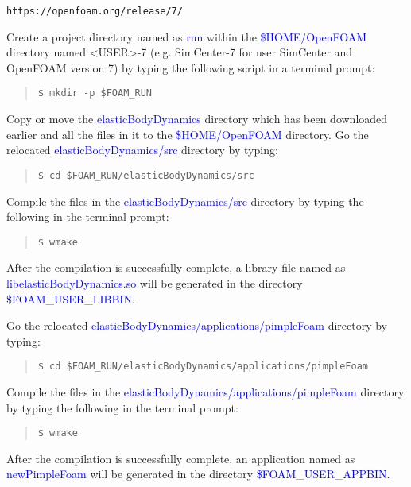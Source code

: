 \begin{verbatim}
https://openfoam.org/release/7/
\end{verbatim}

\noindent Create a project directory named as \textcolor{blue}{run} within the \textcolor{blue}{\$HOME/OpenFOAM} directory named \textless{USER}\textgreater{-7} (e.g. SimCenter-7 for user SimCenter and OpenFOAM version 7) by typing the following script in a terminal prompt:

\begin{quote}
\begin{verbatim}
$ mkdir -p $FOAM_RUN
\end{verbatim}
\end{quote}

\noindent Copy or move the \textcolor{blue}{elasticBodyDynamics} directory which has been downloaded earlier and all the files in it to the \textcolor{blue}{\$HOME/OpenFOAM} directory. Go the relocated \textcolor{blue}{elasticBodyDynamics/src} directory by typing:

\begin{quote}
\begin{verbatim}
$ cd $FOAM_RUN/elasticBodyDynamics/src
\end{verbatim}
\end{quote}

\noindent Compile the files in the \textcolor{blue}{elasticBodyDynamics/src} directory by typing the following in the terminal prompt:

\begin{quote}
\begin{verbatim}
$ wmake
\end{verbatim}
\end{quote}

\noindent After the compilation is successfully complete, a library file named as \textcolor{blue}{libelasticBodyDynamics.so} will be generated in the directory \textcolor{blue}{\$FOAM\_USER\_LIBBIN}.

\noindent Go the relocated \textcolor{blue}{elasticBodyDynamics/applications/pimpleFoam} directory by typing:

\begin{quote}
\begin{verbatim}
$ cd $FOAM_RUN/elasticBodyDynamics/applications/pimpleFoam
\end{verbatim}
\end{quote}

\noindent Compile the files in the \textcolor{blue}{elasticBodyDynamics/applications/pimpleFoam} directory by typing the following in the terminal prompt:

\begin{quote}
\begin{verbatim}
$ wmake
\end{verbatim}
\end{quote}

\noindent After the compilation is successfully complete, an application named as \textcolor{blue}{newPimpleFoam} will be generated in the directory \textcolor{blue}{\$FOAM\_USER\_APPBIN}.




